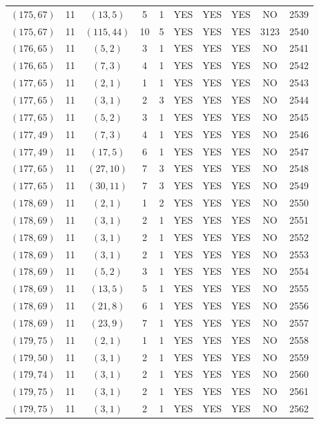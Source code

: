\begin{longtable}{|c|c|c|c|c|c|c|c|c|c|}
$(175, 67)$ & 11 & $(13, 5)$ & 5 & 1 & YES & YES & YES & NO & 2539\\
$(175, 67)$ & 11 & $(115, 44)$ & 10 & 5 & YES & YES & YES & 3123 & 2540\\
$(176, 65)$ & 11 & $(5, 2)$ & 3 & 1 & YES & YES & YES & NO & 2541\\
$(176, 65)$ & 11 & $(7, 3)$ & 4 & 1 & YES & YES & YES & NO & 2542\\
$(177, 65)$ & 11 & $(2, 1)$ & 1 & 1 & YES & YES & YES & NO & 2543\\
$(177, 65)$ & 11 & $(3, 1)$ & 2 & 3 & YES & YES & YES & NO & 2544\\
$(177, 65)$ & 11 & $(5, 2)$ & 3 & 1 & YES & YES & YES & NO & 2545\\
$(177, 49)$ & 11 & $(7, 3)$ & 4 & 1 & YES & YES & YES & NO & 2546\\
$(177, 49)$ & 11 & $(17, 5)$ & 6 & 1 & YES & YES & YES & NO & 2547\\
$(177, 65)$ & 11 & $(27, 10)$ & 7 & 3 & YES & YES & YES & NO & 2548\\
$(177, 65)$ & 11 & $(30, 11)$ & 7 & 3 & YES & YES & YES & NO & 2549\\
$(178, 69)$ & 11 & $(2, 1)$ & 1 & 2 & YES & YES & YES & NO & 2550\\
$(178, 69)$ & 11 & $(3, 1)$ & 2 & 1 & YES & YES & YES & NO & 2551\\
$(178, 69)$ & 11 & $(3, 1)$ & 2 & 1 & YES & YES & YES & NO & 2552\\
$(178, 69)$ & 11 & $(3, 1)$ & 2 & 1 & YES & YES & YES & NO & 2553\\
$(178, 69)$ & 11 & $(5, 2)$ & 3 & 1 & YES & YES & YES & NO & 2554\\
$(178, 69)$ & 11 & $(13, 5)$ & 5 & 1 & YES & YES & YES & NO & 2555\\
$(178, 69)$ & 11 & $(21, 8)$ & 6 & 1 & YES & YES & YES & NO & 2556\\
$(178, 69)$ & 11 & $(23, 9)$ & 7 & 1 & YES & YES & YES & NO & 2557\\
$(179, 75)$ & 11 & $(2, 1)$ & 1 & 1 & YES & YES & YES & NO & 2558\\
$(179, 50)$ & 11 & $(3, 1)$ & 2 & 1 & YES & YES & YES & NO & 2559\\
$(179, 74)$ & 11 & $(3, 1)$ & 2 & 1 & YES & YES & YES & NO & 2560\\
$(179, 75)$ & 11 & $(3, 1)$ & 2 & 1 & YES & YES & YES & NO & 2561\\
$(179, 75)$ & 11 & $(3, 1)$ & 2 & 1 & YES & YES & YES & NO & 2562\\

\end{longtable}
